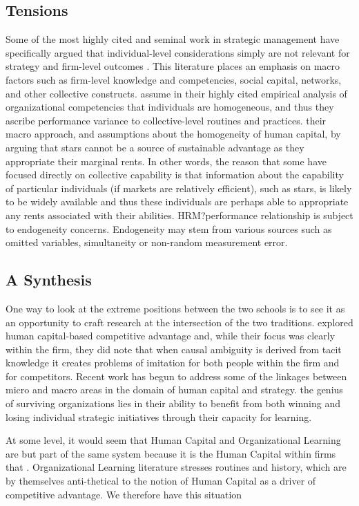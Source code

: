 \documentclass[12pt,letterpaper]{article}
\begin{document}
\subsection{Tensions}
Some of the most highly cited and seminal work in strategic management have specifically argued that individual-level considerations simply are not relevant for strategy and firm-level outcomes \citep{Henderson1994, Kogut1992, Kogut1996, Nahapiet1998, Spender1996}. This literature places an emphasis on macro factors such as firm-level knowledge and competencies, social capital, networks, and other collective constructs. \citep{Henderson1994} assume in their highly cited empirical analysis of organizational competencies that individuals are homogeneous, and thus they ascribe performance variance to collective-level routines and practices.  their macro approach, and assumptions about the homogeneity of human capital, by arguing that stars cannot be a source of sustainable advantage as they appropriate their marginal rents. In other words, the reason that some have focused directly on collective capability is that information about the capability of particular individuals (if markets are relatively efficient), such as stars, is likely to be widely available and thus these individuals are perhaps able to appropriate any rents associated with their abilities. HRM?performance relationship is subject to endogeneity concerns. Endogeneity may stem from various sources such as omitted variables, simultaneity or non-random measurement error.

\subsection{A Synthesis}
One way to look at the extreme positions between the two schools is to see it as an opportunity to craft research at the intersection of the two traditions. \cite{Coff2011} explored human capital-based competitive advantage and, while their focus was clearly within the firm, they did note that when causal ambiguity is derived from tacit knowledge it creates problems of imitation for both people within the firm and for competitors.
Recent work \citep{Coff2011, Ployhart2011} has begun to address some of the linkages between micro and macro areas in the domain of human capital and strategy. \cite{Burgelman1991} the genius of surviving organizations lies in their ability to benefit from both winning and losing individual strategic initiatives through their capacity for learning.


At some level, it would seem that Human Capital and Organizational Learning are but part of the same system because it is the Human Capital within firms that . Organizational Learning literature stresses routines and history, which are by themselves anti-thetical to the notion of Human Capital as a driver of competitive advantage. We therefore have this situation
\end{document}
